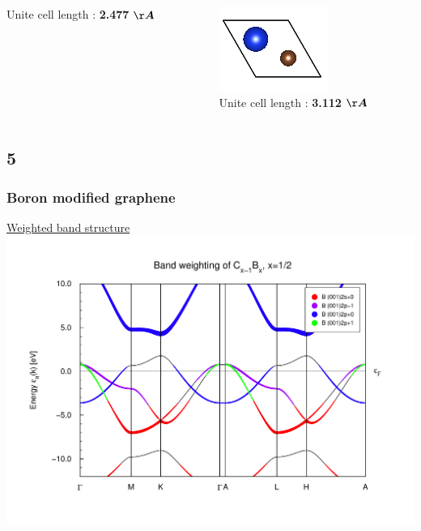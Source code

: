 \documentclass{beamer}
\begin{document}
\begin{frame}
\begin{columns}[T]
\begin{column}{.28\textwidth}
					Unite cell length : \textbf{2.477} $\boldsymbol{\AA}$
				\end{column}%
				\hfill%
				\begin{column}{.28\textwidth}
					\centering
					\includegraphics[width=\textwidth]{figures/GrapheneSilicium1_20A.png} \\
					Unite cell length : \textbf{3.112} $\boldsymbol{\AA}$
				\end{column}%
			\end{columns}
		\end{frame}
		
	\subsection*{5}
		\begin{frame}
			\frametitle{Boron modified graphene}
			\underline{Weighted band structure}
			\includegraphics[width=\textwidth]{figures/Bor1R/bweights.pdf}
		\end{frame}
\end{document}
